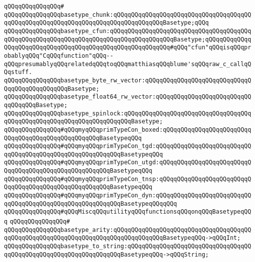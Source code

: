 \verb|qQQqqQQqqQQqqQQq#|\newline
\verb|qQQqqQQqqQQqqQQqbasetype_chunk:qQQqqQQqqQQqqQQqqQQqqQQqqQQqqQQqqQQqqQQqqQQqqQQqqQQqqQQqqQQqqQQqqQQqqQQqqQQqqQQqqQQqBasetype;qQQq|\newline
\verb|qQQqqQQqqQQqqQQqbasetype_cfun:qQQqqQQqqQQqqQQqqQQqqQQqqQQqqQQqqQQqqQQqqQQqqQQqqQQqqQQqqQQqqQQqqQQqqQQqqQQqqQQqqQQqqQQqBasetype;qQQqqQQqqQQqqQQqqQQqqQQqqQQqqQQqqQQqqQQqqQQqqQQqqQQqqQQqqQQq#qQQq"cfun"qQQqisqQQqprobablyqQQq"CqQQqfunction"qQQq--qQQqpresumablyqQQqrelatedqQQqtoqQQqmatthiasqQQqblume'sqQQqraw_c_callqQQqstuff.|\newline
\verb|qQQqqQQqqQQqqQQqbasetype_byte_rw_vector:qQQqqQQqqQQqqQQqqQQqqQQqqQQqqQQqqQQqqQQqqQQqqQQqBasetype;|\newline
\verb|qQQqqQQqqQQqqQQqbasetype_float64_rw_vector:qQQqqQQqqQQqqQQqqQQqqQQqqQQqqQQqqQQqBasetype;|\newline
\verb|qQQqqQQqqQQqqQQqbasetype_spinlock:qQQqqQQqqQQqqQQqqQQqqQQqqQQqqQQqqQQqqQQqqQQqqQQqqQQqqQQqqQQqqQQqqQQqqQQqBasetype;|\newline
\newline
\newline
\verb|qQQqqQQqqQQqqQQq#qQQqmyqQQqprimTypeCon_boxed:qQQqqQQqqQQqqQQqqQQqqQQqqQQqqQQqqQQqqQQqqQQqqQQqqQQqBasetypeqQQq|\newline
\verb|qQQqqQQqqQQqqQQq#qQQqmyqQQqprimTypeCon_tgd:qQQqqQQqqQQqqQQqqQQqqQQqqQQqqQQqqQQqqQQqqQQqqQQqqQQqqQQqqQQqBasetypeqQQq|\newline
\verb|qQQqqQQqqQQqqQQq#qQQqmyqQQqprimTypeCon_utgd:qQQqqQQqqQQqqQQqqQQqqQQqqQQqqQQqqQQqqQQqqQQqqQQqqQQqqQQqBasetypeqQQq|\newline
\verb|qQQqqQQqqQQqqQQq#qQQqmyqQQqprimTypeCon_tnsp:qQQqqQQqqQQqqQQqqQQqqQQqqQQqqQQqqQQqqQQqqQQqqQQqqQQqqQQqBasetypeqQQq|\newline
\verb|qQQqqQQqqQQqqQQq#qQQqmyqQQqprimTypeCon_dyn:qQQqqQQqqQQqqQQqqQQqqQQqqQQqqQQqqQQqqQQqqQQqqQQqqQQqqQQqqQQqBasetypeqQQqqQQq|\newline
\newline
\newline
\verb|qQQqqQQqqQQqqQQq#qQQqMiscqQQqutilityqQQqfunctionsqQQqonqQQqBasetypeqQQq|\newline
\verb|qQQqqQQqqQQqqQQq#|\newline
\verb|qQQqqQQqqQQqqQQqbasetype_arity:qQQqqQQqqQQqqQQqqQQqqQQqqQQqqQQqqQQqqQQqqQQqqQQqqQQqqQQqqQQqqQQqqQQqqQQqqQQqqQQqqQQqBasetypeqQQq->qQQqInt;|\newline
\verb|qQQqqQQqqQQqqQQqbasetype_to_string:qQQqqQQqqQQqqQQqqQQqqQQqqQQqqQQqqQQqqQQqqQQqqQQqqQQqqQQqqQQqqQQqqQQqBasetypeqQQq->qQQqString;|\newline
